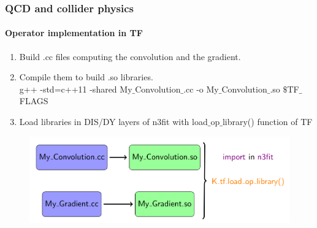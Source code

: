 \documentclass[aspectratio=43]{beamer}
\begin{document}
\begin{frame}

	\frametitle{QCD and collider physics}
	\framesubtitle{Operator implementation in TF}
	
	\footnotesize
	
	\begin{enumerate}
		\item Build {\color{blue}.cc} files computing the convolution and the gradient.
		\item Compile them to build {\color{darkgreen}.so} libraries. \\
		{\color{orange}g++ -std=c++11 -shared My$\_$Convolution$\_$.cc -o My$\_$Convolution$\_$.so $\$$TF$\_$FLAGS}
		\item Load libraries in DIS/DY layers of {\color{violet} n3fit} with {\color{orange} load$\_$op$\_$library()} function of TF
	\end{enumerate}

	\begin{figure}
			\includegraphics[width = 10.5 cm]{plots/backup/n3fit3.png}
	\end{figure}

\end{frame}
\end{document}

